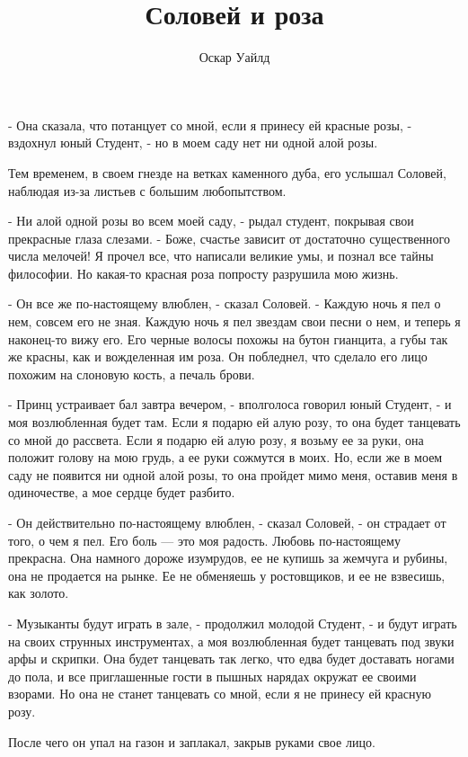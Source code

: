 \documentclass[a4paper]{article}
\date{}
\author{Оскар Уайлд}
\title{Соловей и роза}
\theoremstyle{defin}
\theoremstyle{theorem}
\theoremstyle{prop}
\theoremstyle{lemma}
\theoremstyle{ex}
\theoremstyle{col}
\begin{document}
\maketitle

- Она сказала, что потанцует со мной, если я принесу ей красные розы, - вздохнул юный Студент, - но в моем саду нет ни одной алой розы.

Тем временем, в своем гнезде на ветках каменного дуба, его услышал Соловей, наблюдая из-за листьев с большим любопытством.

- Ни алой одной розы во всем моей саду, - рыдал студент, покрывая свои прекрасные глаза слезами. - Боже, счастье зависит от достаточно существенного числа мелочей! Я прочел все, что написали великие умы, и познал все тайны философии. Но какая-то красная роза попросту разрушила мою жизнь.

- Он все же по-настоящему влюблен, - сказал Соловей. - Каждую ночь я пел о нем, совсем его не зная. Каждую ночь я пел звездам
свои песни о нем, и теперь я наконец-то вижу его. Его черные волосы похожы на бутон гианцита, а губы так же красны, как и
вожделенная им роза. Он побледнел, что сделало его лицо похожим на слоновую кость, а печаль брови.

- Принц устраивает бал завтра вечером, - вполголоса говорил юный Студент, - и моя возлюбленная будет там. Если я подарю ей алую розу, то она будет танцевать со мной до рассвета. Если я подарю ей алую розу, я возьму ее за руки, она положит голову на мою грудь, а ее руки сожмутся в моих. Но, если же в моем саду не появится ни одной алой розы, то она пройдет мимо меня, оставив меня в одиночестве, а мое сердце будет разбито.

- Он действительно по-настоящему влюблен, - сказал Соловей, - он страдает от того, о чем я пел. Его боль --- это моя радость. Любовь по-настоящему прекрасна. Она намного дороже изумрудов, ее не купишь за жемчуга и рубины, она не продается на рынке.
Ее не обменяешь у ростовщиков, и ее не взвесишь, как золото.

- Музыканты будут играть в зале, - продолжил молодой Студент, - и будут играть на своих струнных инструментах, а моя возлюбленная будет танцевать под звуки арфы и скрипки. Она будет танцевать так легко, что едва будет доставать ногами до пола, и
все приглашенные гости в пышных нарядах окружат ее своими взорами. Но она не станет танцевать со мной, если я не принесу ей красную розу.

После чего он упал на газон и заплакал, закрыв руками свое лицо.
\end{document}

